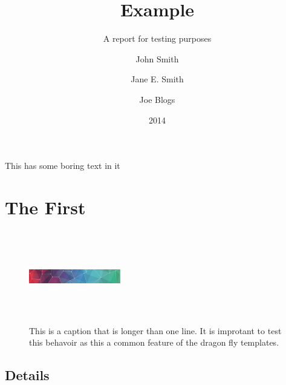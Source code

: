 \documentclass{aebr}
\title{Example}{An Example\\ Report about \emph{sheep} but that also has such
a long title that it actually has to wrap!}
\subtitle{A report for testing purposes}
\date{2014}
\author{John Smith \and Jane E. Smith \and Joe Blogs}
\begin{document}
\maketitle

\tableofcontents


\summary

\citeself

This has some boring text in it



\section{The First}

\lipsum[1]


\begin{figure}[h]
  \includegraphics[width=40mm,height=40mm]{pattern}
  \caption{This is a caption that is longer than one line. It is improtant to test 
  this behavoir as this a common feature of the dragon fly templates.}
\end{figure}

\subsection{Details}

\lipsum[2]
\end{document}
